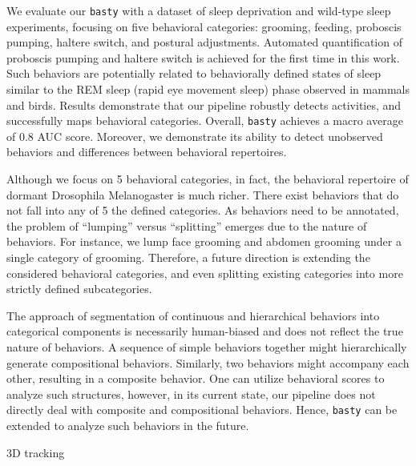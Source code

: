We evaluate our \texttt{basty} with a dataset of sleep deprivation and wild-type sleep experiments, focusing on five behavioral categories: grooming, feeding, proboscis pumping, haltere switch, and postural adjustments.
Automated quantification of proboscis pumping and haltere switch is achieved for the first time in this work.
Such behaviors are potentially related to behaviorally defined states of sleep similar to the REM sleep (rapid eye movement sleep) phase observed in mammals and birds.
Results demonstrate that our pipeline robustly detects activities, and successfully maps behavioral categories.
Overall, \texttt{basty} achieves a macro average of 0.8 AUC score.
Moreover, we demonstrate its ability to detect unobserved behaviors and differences between behavioral repertoires.

Although we focus on 5 behavioral categories, in fact, the behavioral repertoire of dormant Drosophila Melanogaster is much richer. There exist behaviors that do not fall into any of 5 the defined categories. 
As behaviors need to be annotated, the problem of ``lumping'' versus ``splitting'' emerges due to the nature of behaviors. For instance, we lump face grooming and abdomen grooming under a single category of grooming.
Therefore, a future direction is extending the considered behavioral categories, and even splitting existing categories into more strictly defined subcategories. 

The approach of segmentation of continuous and hierarchical behaviors into categorical components is necessarily human-biased and does not reflect the true nature of behaviors. A sequence of simple behaviors together might hierarchically generate compositional behaviors. Similarly, two behaviors might accompany each other, resulting in a composite behavior. One can utilize behavioral scores to analyze such structures, however, in its current state, our pipeline does not directly deal with composite and compositional behaviors.
Hence, \texttt{basty} can be extended to analyze such behaviors in the future.

3D tracking

